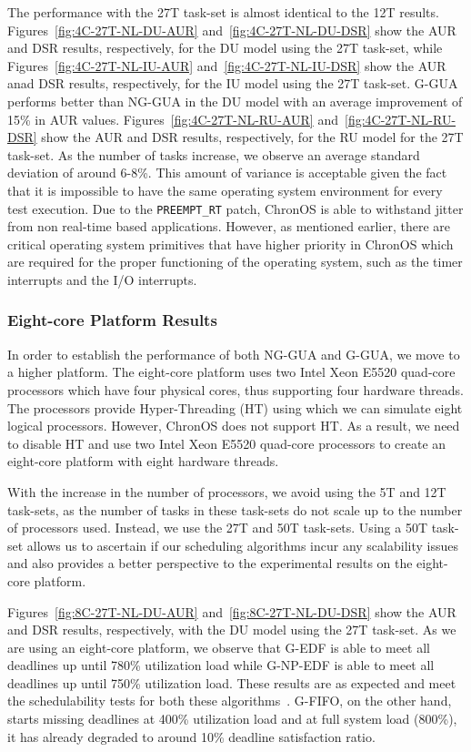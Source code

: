 \documentclass[12pt,dvips]{report}
\begin{document}
The performance with the 27T task-set is almost identical to the 12T results. Figures~\ref{fig:4C-27T-NL-DU-AUR} and~\ref{fig:4C-27T-NL-DU-DSR} show the AUR and DSR results, respectively, for the DU model using the 27T task-set, while Figures~\ref{fig:4C-27T-NL-IU-AUR} and~\ref{fig:4C-27T-NL-IU-DSR} show the AUR anad DSR results, respectively, for the IU model using the 27T task-set. G-GUA performs better than NG-GUA in the DU model with an average improvement of 15\% in AUR values. Figures~\ref{fig:4C-27T-NL-RU-AUR} and~\ref{fig:4C-27T-NL-RU-DSR} show the AUR and DSR results, respectively, for the RU model for the 27T task-set.  As the number of tasks increase, we observe an average standard deviation of around 6-8\%. This amount of variance is acceptable given the fact that it is impossible to have the same operating system environment for every test execution. Due to the \texttt{PREEMPT\_RT} patch, ChronOS is able to withstand jitter from non real-time based applications. However, as mentioned earlier, there are critical operating system primitives that have higher priority in ChronOS which are required for the proper functioning of the operating system, such as the timer interrupts and the I/O interrupts.

\subsubsection{Eight-core Platform Results} 

In order to establish the performance of both NG-GUA and G-GUA, we move to a higher platform. The eight-core platform uses two Intel Xeon E5520 quad-core processors which have four physical cores, thus supporting four hardware threads. The processors provide Hyper-Threading (HT) using which we can simulate eight logical processors. However, ChronOS does not support HT. As a result, we need to disable HT and use two Intel Xeon E5520 quad-core processors to create an eight-core platform with eight hardware threads.

With the increase in the number of processors, we avoid using the 5T and 12T task-sets, as the number of tasks in these task-sets do not scale up to the number of processors used. Instead, we use the 27T and 50T task-sets. Using a 50T task-set allows us to ascertain if our scheduling algorithms incur any scalability issues and also provides a better perspective to the experimental results on the eight-core platform.

Figures~\ref{fig:8C-27T-NL-DU-AUR} and~\ref{fig:8C-27T-NL-DU-DSR} show the AUR and DSR results, respectively, with the DU model using the 27T task-set. As we are using an eight-core platform, we observe that G-EDF is able to meet all deadlines up until 780\% utilization load while G-NP-EDF is able to meet all deadlines up until 750\% utilization load. These results are as expected and meet the schedulability tests for both these algorithms~\cite{Baruah-gnpedf}. G-FIFO, on the other hand, starts missing deadlines at 400\% utilization load and at full system load (800\%), it has already degraded to around 10\% deadline satisfaction ratio.
\end{document}
